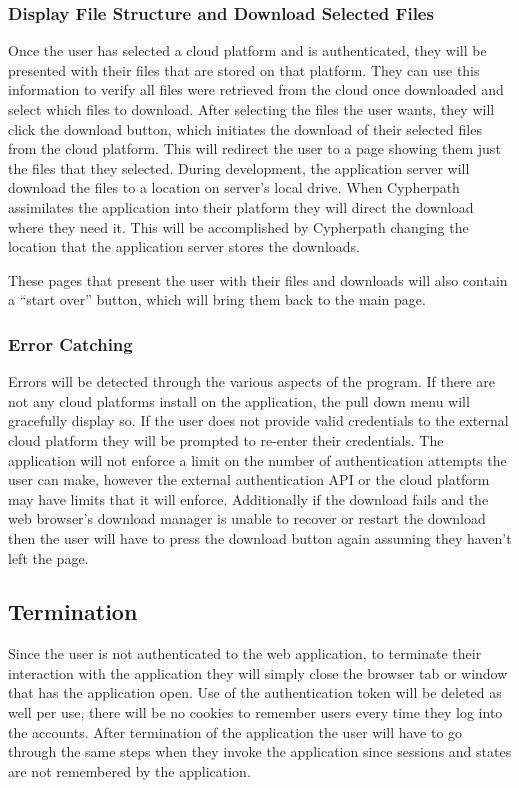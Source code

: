 \documentclass{article}
\begin{document}
            \subsubsection{Display File Structure and Download Selected Files}
            Once the user has selected a cloud platform and is authenticated, they will be presented with their files that are stored on that platform. They can use this information to verify all files were retrieved
            from the cloud once downloaded and select which
            files to download. After selecting the files the user wants, they will click the download button, which initiates the download of their selected files from the cloud platform.
            This will redirect the user to a page showing them just the files that they selected. During development, the application server will download the files to a location on server's local drive.
            When Cypherpath assimilates the application into their platform they will direct the download where they need it. This will be accomplished by Cypherpath changing the location that the application server
            stores the downloads.

            These pages that present the user with their files and downloads will also contain a ``start over'' button, which will bring them back to the main page.

            \subsubsection{Error Catching}
            Errors will be detected through the various aspects of the program. If there are not any cloud platforms install on the application, the pull down menu will gracefully display so. If the user does not
            provide valid credentials to the external cloud platform they will be prompted to re-enter their credentials.
            The application will not enforce a limit on the number of authentication attempts the user can make, however the external authentication API or the cloud platform may have limits that it will enforce.
            Additionally if the download fails and the web browser's download manager is unable to recover or restart the download then the user will have to press the download button again assuming they haven't left
            the page.

        \subsection{Termination}
        Since the user is not authenticated to the web application, to terminate their interaction with the application they will simply close the browser tab or window that has the
        application open. Use of the authentication token will be deleted as well per use, there will be no cookies to remember users every time they log into the accounts. After termination
        of the application the user will have to go through the same steps when they invoke the application since sessions and states are not remembered by the application.
\end{document}
